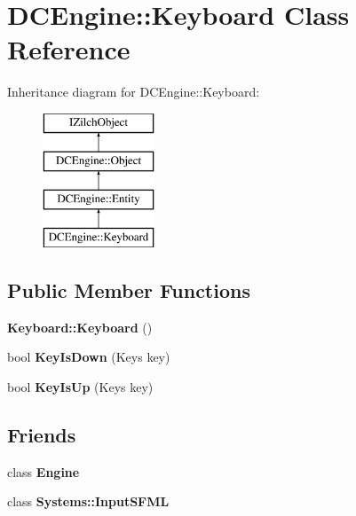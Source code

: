 \hypertarget{classDCEngine_1_1Keyboard}{\section{D\-C\-Engine\-:\-:Keyboard Class Reference}
\label{classDCEngine_1_1Keyboard}
}
Inheritance diagram for D\-C\-Engine\-:\-:Keyboard\-:\begin{figure}[H]
\begin{center}
\leavevmode
\includegraphics[height=4.000000cm]{classDCEngine_1_1Keyboard}
\end{center}
\end{figure}
\subsection*{Public Member Functions}
\begin{DoxyCompactItemize}
\item 
\hypertarget{classDCEngine_1_1Keyboard_aebd763470c1400d3fd9c83a6a9afce18}{{\bfseries Keyboard\-::\-Keyboard} ()}\label{classDCEngine_1_1Keyboard_aebd763470c1400d3fd9c83a6a9afce18}

\item 
\hypertarget{classDCEngine_1_1Keyboard_a7235fd1c79fa5c8aff6b459f01276663}{bool {\bfseries Key\-Is\-Down} (Keys key)}\label{classDCEngine_1_1Keyboard_a7235fd1c79fa5c8aff6b459f01276663}

\item 
\hypertarget{classDCEngine_1_1Keyboard_ae20756b32ccfa3f2be93a7c497e5eda3}{bool {\bfseries Key\-Is\-Up} (Keys key)}\label{classDCEngine_1_1Keyboard_ae20756b32ccfa3f2be93a7c497e5eda3}

\end{DoxyCompactItemize}
\subsection*{Friends}
\begin{DoxyCompactItemize}
\item 
\hypertarget{classDCEngine_1_1Keyboard_a3e1914489e4bed4f9f23cdeab34a43dc}{class {\bfseries Engine}}\label{classDCEngine_1_1Keyboard_a3e1914489e4bed4f9f23cdeab34a43dc}

\item 
\hypertarget{classDCEngine_1_1Keyboard_a4e4db07dae7df718d000df5cdd678463}{class {\bfseries Systems\-::\-Input\-S\-F\-M\-L}}\label{classDCEngine_1_1Keyboard_a4e4db07dae7df718d000df5cdd678463}

\end{DoxyCompactItemize}
